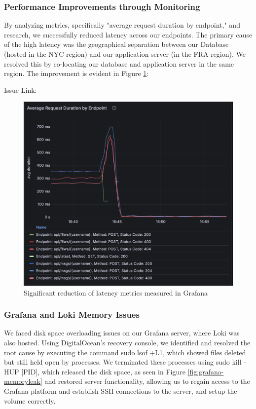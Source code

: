 \subsubsection{Performance Improvements through Monitoring}
By analyzing metrics, specifically "average request duration by endpoint," and research, we successfully reduced latency across our endpoints. The primary cause of the high latency was the geographical separation between our Database (hosted in the NYC region) and our application server (in the FRA region). We resolved this by co-locating our database and application server in the same region. The improvement is evident in Figure \ref{fig:grafana-endpoints-latency}:

Issue Link:

\begin{figure}[H]
\centering
\includegraphics[height=0.9\textwidth]{images/grafana-endpoints-latency.png}
\caption{Significant reduction of latency metrics measured in Grafana}
\label{fig:grafana-endpoints-latency}
\end{figure}

\subsubsection{Grafana and Loki Memory Issues}
We faced disk space overloading issues on our Grafana server, where Loki was also hosted. Using DigitalOcean's recovery console, we identified and resolved the root cause by executing the command sudo lsof +L1, which showed files deleted but still held open by processes. We terminated these processes using sudo kill -HUP [PID], which released the disk space, as seen in Figure \ref{fig:grafana-memoryleak} and restored server functionality, allowing us to regain access to the Grafana platform and establish SSH connections to the server, and setup the volume correctly. 

